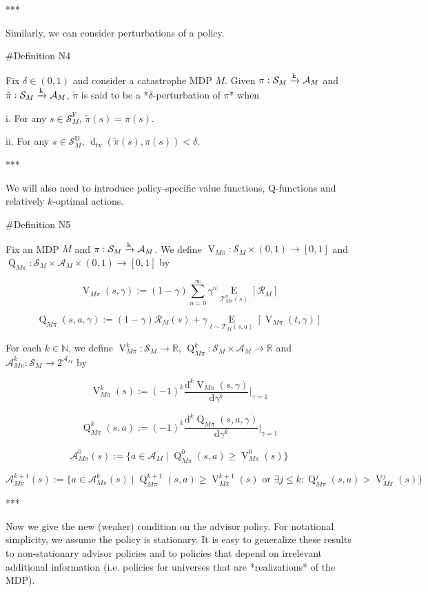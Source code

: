 \documentclass[a4paper]{article}
\newcommand{\AP}[1]{\left(#1\right)}
\newcommand{\AB}[1]{\left[#1\right]}
\newcommand{\Ea}[2]{\underset{#1}{\operatorname{E}}\AB{#2}}
\newcommand{\D}{\mathrm{d}}
\newcommand{\Dtva}[1]{\operatorname{d}_{\text{tv}}\AP{#1}}
\newcommand{\Nats}{\mathbb{N}}
\newcommand{\Reals}{\mathbb{R}}
\newcommand{\M}{\xrightarrow{\textnormal{k}}}
\newcommand{\A}{\mathcal{A}}
\newcommand{\St}{\mathcal{S}}
\newcommand{\T}{\mathcal{T}}
\newcommand{\R}{\mathcal{R}}
\newcommand{\RMD}{\mathrm{D}}
\newcommand{\RMF}{\mathrm{F}}
\newcommand{\SF}{\St^{\RMF}}
\newcommand{\SD}{\St^{\RMD}}
\newcommand{\V}{\operatorname{V}}
\newcommand{\Q}{\operatorname{Q}}
\begin{document}
***

Similarly, we can consider perturbations of a policy.

\#Definition N4

Fix $\delta\in(0,1)$ and consider a catastrophe MDP $M$. Given $\pi: \St_M \M \A_M$ and $\tilde{\pi}: \St_M \M \A_M$, $\tilde{\pi}$ is said to be a *$\delta$-perturbation of $\pi$* when

i. For any $s \in \SF_M$, $\tilde{\pi}(s) = \pi(s)$.

ii. For any $s \in \SD_M$, $\Dtva{\tilde{\pi}(s),\pi(s)} < \delta$.

***

We will also need to introduce policy-specific value functions, Q-functions and relatively $k$-optimal actions.

\#Definition N5

Fix an MDP $M$ and $\pi: \St_M \M \A_M$. We define $\V_{M\pi}: \St_M \times (0,1) \rightarrow [0,1]$ and $\Q_{M\pi}: \St_M \times \A_M \times (0,1) \rightarrow [0,1]$ by

$$\V_{M\pi}(s,\gamma) := (1-\gamma) \sum_{n=0}^\infty \gamma^n \Ea{\T_{M\pi}^n(s)}{\R_M}$$

$$\Q_{M\pi}(s,a,\gamma) := (1-\gamma) \R_M(s) + \gamma \Ea{t \sim \T_{M}(s,a)}{\V_{M\pi}(t,\gamma)}$$

For each $k \in \Nats$, we define $\V_{M\pi}^k: \St_M \rightarrow \Reals$, $\Q_{M\pi}^k: \St_M \times \A_M \rightarrow \Reals$ and $\A_{M\pi}^k: \St_M \rightarrow 2^{\A_M}$ by

$$\V_{M\pi}^k(s) := (-1)^k \frac{\D^k \V_{M\pi}(s,\gamma)}{\D\gamma^k}\bigg\vert_{\gamma=1}$$

$$\Q_{M\pi}^k(s,a) := (-1)^k \frac{\D^k \Q_{M\pi}(s,a,\gamma)}{\D\gamma^k}\bigg\vert_{\gamma=1}$$

$$\A_{M\pi}^0(s) := \{a \in \A_M \mid \Q_{M\pi}^0(s,a) \geq \V_{M\pi}^0(s)\}$$

$$\A_{M\pi}^{k+1}(s) := \{a \in \A_{M\pi}^k(s) \mid \Q_{M\pi}^{k+1}(s,a) \geq \V_{M\pi}^{k+1}(s) \text{ or } \exists j \leq k: \Q_{M\pi}^{j}(s,a) > \V_{M\pi}^{j}(s)\}$$

***

Now we give the new (weaker) condition on the advisor policy. For notational simplicity, we assume the policy is stationary. It is easy to generalize these results to non-stationary advisor policies and to policies that depend on irrelevant additional information (i.e. policies for universes that are *realizations* of the MDP).
\end{document}
